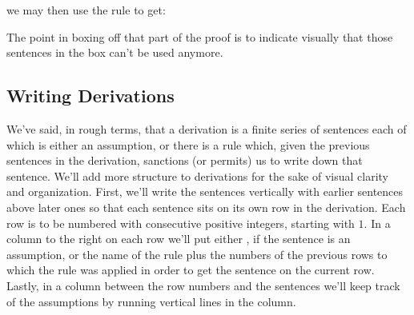 \begin{gproof}[\label{conditionalintro}]
\end{gproof}

\noindent{}we may then use the rule  to get:

\begin{gproof}[\label{conditionalintroclosed}]
\end{gproof}

\noindent{}The point in boxing off that part of the proof is to indicate visually that those sentences in the box can't be used anymore. 

\subsection{Writing Derivations}

We've said, in rough terms, that a derivation is a finite series of sentences each of which is either an assumption, or there is a rule which, given the previous sentences in the derivation, sanctions (or permits) us to write down that sentence. 
We'll add more structure to derivations for the sake of visual clarity and organization. 
First, we'll write the sentences vertically with earlier sentences above later ones so that each sentence sits on its own row in the derivation. 
Each row is to be numbered with consecutive positive integers, starting with $1$.
In a column to the right on each row we'll put either , if the sentence is an assumption, or the name of the rule plus the numbers of the previous rows to which the rule was applied in order to get the sentence on the current row. 
Lastly, in a column between the row numbers and the sentences we'll keep track of the assumptions by running vertical lines in the column.

